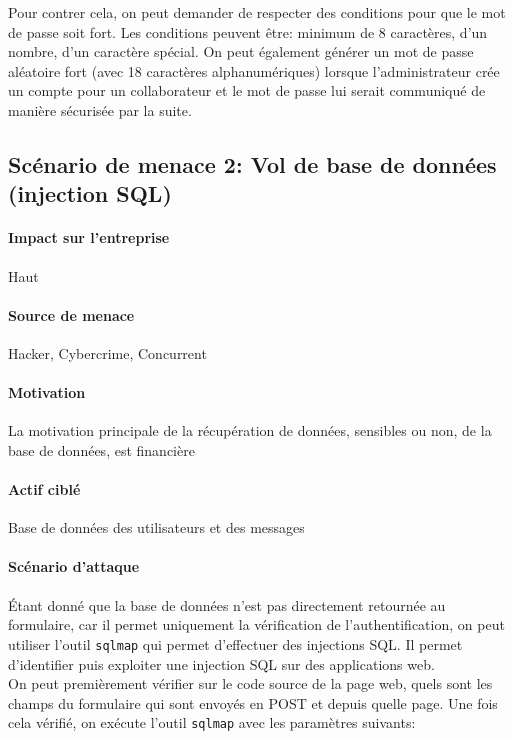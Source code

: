 \documentclass[a4paper,10pt]{article}
\begin{document}
        Pour contrer cela, on peut demander de respecter des conditions pour que le mot de passe soit fort. Les conditions peuvent être: minimum de 8 caractères, d'un nombre, d'un caractère spécial. On peut également générer un mot de passe aléatoire fort (avec 18 caractères alphanumériques) lorsque l'administrateur crée un compte pour un collaborateur et le mot de passe lui serait communiqué de manière sécurisée par la suite.
    \subsection*{Scénario de menace 2: Vol de base de données (injection SQL)}
        \paragraph{Impact sur l'entreprise} Haut
        \paragraph{Source de menace} Hacker, Cybercrime, Concurrent
        \paragraph{Motivation} La motivation principale de la récupération de données, sensibles ou non, de la base de données, est financière
        \paragraph{Actif ciblé} Base de données des utilisateurs et des messages
        \paragraph{Scénario d'attaque} Étant donné que la base de données n’est pas directement retournée au formulaire, car il permet uniquement la vérification de l’authentification, on peut utiliser l’outil \verb|sqlmap| qui permet d’effectuer des injections SQL. Il permet d’identifier puis exploiter une injection SQL sur des applications web. \\
        
        On peut premièrement vérifier sur le code source de la page web, quels sont les champs du formulaire qui sont envoyés en POST et depuis quelle page. Une fois cela vérifié, on exécute l’outil \verb|sqlmap| avec les paramètres suivants:
        
\end{document}
